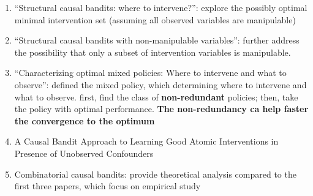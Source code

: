 \begin{enumerate}
\begin{enumerate}
\begin{enumerate}
        \begin{enumerate}
            \item “Structural causal bandits: where to intervene?”: explore the possibly optimal minimal intervention set (assuming all observed variables are manipulable)
            \item “Structural causal bandits with non-manipulable variables”: further address the possibility that only a subset of intervention variables is manipulable.
            \item “Characterizing optimal mixed policies: Where to intervene and what to observe”: defined the mixed policy, which determining where to intervene and what to observe. first, find the class of \textbf{non-redundant} policies; then, take the policy with optimal performance. \textbf{The non-redundancy ca help faster the convergence to the optimum}
            \item A Causal Bandit Approach to Learning Good Atomic Interventions in Presence of Unobserved Confounders
            \item Combinatorial causal bandits: provide theoretical analysis compared to the first three papers, which focus on empirical study
        \end{enumerate}
        \end{enumerate}


\end{enumerate}
\end{enumerate}
